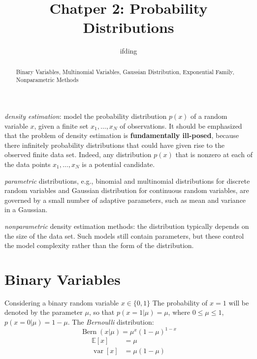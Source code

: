 \documentclass[5p,sort&compress]{elsarticle}
\begin{document}
\begin{frontmatter}
    \title{Chatper 2: Probability Distributions}
    \author{ifding}
    
    \begin{abstract}
        Binary Variables, Multinomial Variables, Gaussian Distribution, Exponential Family, Nonparametric Methods
    \end{abstract}


\end{frontmatter}


\textit{density estimation}:  model the probability distribution $p(x)$ of a random variable $x$, given a finite set $x_1, \ldots, x_N$ of observations. It should be emphasized that the problem of density estimation is \textbf{fundamentally ill-posed}, because there infinitely probability distributions that could have given rise to the observed finite data set. Indeed, any distribution $p(x)$ that is nonzero at each of the data points $x_1, \ldots, x_N$ is a potential candidate.

\textit{parametric} distributions, e.g., binomial and multinomial distributions for discrete random variables and Gaussian distribution for continuous random variables, are governed by a small number of adaptive parameters, such as mean and variance in a Gaussian.

\textit{nonparametric} density estimation methods: the distribution typically depends on the size of the data set. Such models still contain parameters, but these control the model complexity rather than the form of the distribution.


\section{Binary Variables}

Considering a binary random variable $x \in \{0, 1\}$ The probability of $x=1$ will be denoted by the parameter $\mu$, so that $p(x=1 | \mu) = \mu$, where $0 \leq \mu \leq 1$, $p(x=0 | \mu) = 1- \mu$. The \textit{Bernoulli} distribution:
\begin{equation}
\operatorname{Bern}(x | \mu)=\mu^{x}(1-\mu)^{1-x}
\end{equation}
\begin{equation}
\begin{aligned} \mathbb{E}[x] &=\mu \\ \operatorname{var}[x] &=\mu(1-\mu) \end{aligned}
\end{equation}
\end{document}
